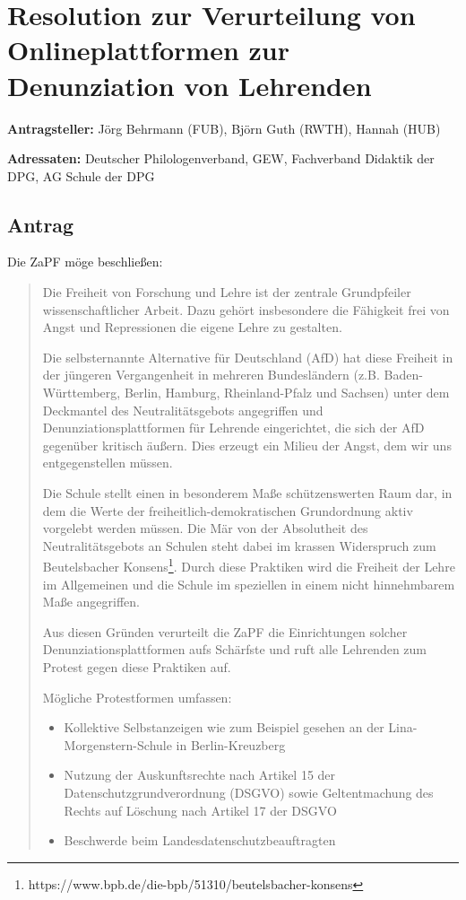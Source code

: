 \documentclass[draft,10pt,oneside]{scrartcl}
\begin{document}
\section*{Resolution zur Verurteilung von Onlineplattformen zur Denunziation
von Lehrenden}

\textbf{Antragsteller:} Jörg Behrmann (FUB), Björn Guth (RWTH), Hannah (HUB)

\textbf{Adressaten:} Deutscher Philologenverband, GEW, Fachverband Didaktik der
DPG, AG Schule der DPG

\subsection*{Antrag}

Die ZaPF möge beschließen:

\begin{quote} Die Freiheit von Forschung und Lehre ist der zentrale
    Grundpfeiler wissenschaftlicher Arbeit. Dazu gehört insbesondere die
    Fähigkeit frei von Angst und Repressionen die eigene Lehre zu gestalten.

    Die selbsternannte \glqq{}Alternative für Deutschland\grqq{} (AfD) hat diese
    Freiheit in der jüngeren Vergangenheit in mehreren Bundesländern
    (z.B. Ba\-den-\allowbreak Würt\-tem\-berg, Berlin, Hamburg, Rheinland-Pfalz
    und Sachsen) unter dem Deckmantel des Neutralitätsgebots angegriffen und
    Denunziationsplattformen für Lehrende eingerichtet, die sich der AfD
    gegenüber kritisch äußern. Dies erzeugt ein Milieu der Angst, dem wir uns
    entgegenstellen müssen.

    Die Schule stellt einen in besonderem Maße schützenswerten Raum dar, in dem
    die Werte der freiheitlich-demokratischen Grundordnung aktiv vorgelebt
    werden müssen.  Die Mär von der Absolutheit des Neutralitätsgebots an
    Schulen steht dabei im krassen Widerspruch zum Beutelsbacher
    Konsens\footnote{https://www.bpb.de/die-bpb/51310/beutelsbacher-konsens}.
    Durch diese Praktiken wird die Freiheit der Lehre im Allgemeinen und die
    Schule im speziellen in einem nicht hinnehmbarem Maße angegriffen.

    Aus diesen Gründen verurteilt die ZaPF die Einrichtungen solcher
    Denunziationsplattformen aufs Schärfste und ruft alle Lehrenden zum Protest
    gegen diese Praktiken auf.

    Mögliche Protestformen umfassen:

    \begin{itemize}
        \item Kollektive Selbstanzeigen wie zum Beispiel gesehen an der
            Lina-\allowbreak Morgenstern-\allowbreak Schule in
            Ber\-lin-\allowbreak Kreuz\-berg
        \item Nutzung der Auskunftsrechte nach Artikel 15 der
            Datenschutzgrundverordnung (DSGVO) sowie Geltentmachung des Rechts
            auf Löschung nach Artikel 17 der DSGVO
        \item Beschwerde beim Landesdatenschutzbeauftragten
    \end{itemize}
\end{quote}
\end{document}
